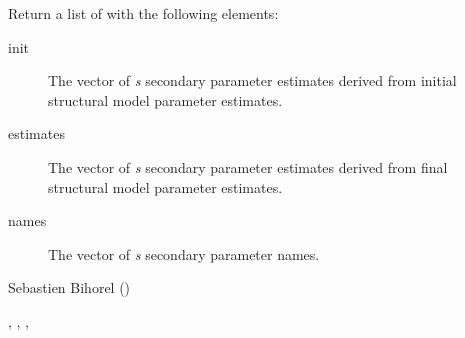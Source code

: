 %
\begin{Value}
Return a list of with the following elements:\begin{description}

\item[init] The vector of \emph{s} secondary parameter estimates derived
from initial structural model parameter estimates.
\item[estimates] The vector of \emph{s} secondary parameter estimates
derived from final structural model parameter estimates.
\item[names] The vector of \emph{s} secondary parameter names.

\end{description}

\end{Value}
%
\begin{Author}\relax
Sebastien Bihorel ()
\end{Author}
%
\begin{SeeAlso}\relax
{},
,
,
\end{SeeAlso}
